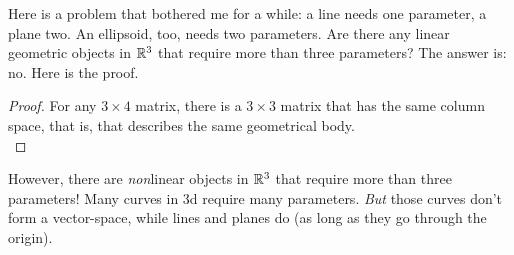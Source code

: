 Here is a problem that bothered me for a while: a line needs one parameter, a plane two. An ellipsoid, too, needs two parameters. Are there any linear geometric objects in $\mathbb{R}^3$ that require more than three parameters? The answer is: no. Here is the proof. 

\begin{proof}
    For any $3 \times 4$ matrix, there is a $3 \times 3$ matrix that has the same column space, that is, that describes the same geometrical body. \\
    
\end{proof}

However, there are \emph{non}linear objects in $\mathbb{R}^3$ that require more than three parameters! Many curves in 3d require many parameters. \emph{But} those curves don't form a vector-space, while lines and planes do (as long as they go through the origin). 


